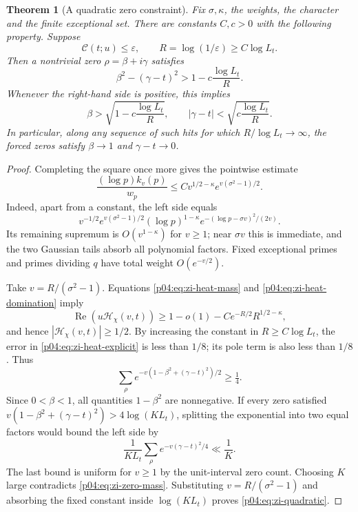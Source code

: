 \documentclass[11pt,letterpaper]{article}
\newtheorem{theorem}{Theorem}[section]
\theoremstyle{definition}
\theoremstyle{remark}
\renewcommand{\Re}{\operatorname{Re}}
\newcommand{\1}{\mathbf 1}
\begin{document}
\begin{theorem}[A quadratic zero constraint]
\label{p04:thm:zi-quadratic}
Fix $\sigma,\kappa$, the weights, the character and the finite
exceptional set.  There are constants $C,c>0$ with the following
property.  Suppose
\[
 \mathcal C(t;u)\le\varepsilon,\qquad
 R=\log(1/\varepsilon)\ge C\log L_t.
\]
Then a nontrivial zero $\rho=\beta+i\gamma$ satisfies
\begin{equation}
 \beta^2-(\gamma-t)^2>
          1-c\frac{\log L_t}{R}.
\label{p04:eq:zi-quadratic}
\end{equation}
Whenever the right-hand side is positive, this implies
\[
 \beta>\sqrt{1-c\frac{\log L_t}{R}},\qquad
 |\gamma-t|<\sqrt{c\frac{\log L_t}{R}}.
\]
In particular, along any sequence of such hits for which
$R/\log L_t\to\infty$, the forced zeros satisfy
$\beta\to1$ and $\gamma-t\to0$.
\end{theorem}
\begin{proof}
Completing the square once more gives the pointwise estimate
\begin{equation}
 \frac{(\log p)k_v(p)}{w_p}
 \le C v^{1/2-\kappa}e^{v(\sigma^2-1)/2}.
\label{p04:eq:zi-heat-domination}
\end{equation}
Indeed, apart from a constant, the left side equals
\[
 v^{-1/2}e^{v(\sigma^2-1)/2}
 (\log p)^{1-\kappa}
 e^{-(\log p-\sigma v)^2/(2v)}.
\]
Its remaining supremum is $O(v^{1-\kappa})$ for $v\ge1$;
near $\sigma v$ this is immediate, and the two Gaussian tails
absorb all polynomial factors.  Fixed exceptional primes and
primes dividing $q$ have total weight $O(e^{-v/2})$.

Take $v=R/(\sigma^2-1)$.  Equations
\eqref{p04:eq:zi-heat-mass} and \eqref{p04:eq:zi-heat-domination} imply
\[
 \Re(u\mathcal H_\chi(v,t))
 \ge1-o(1)-C e^{-R/2}R^{1/2-\kappa},
\]
and hence $|\mathcal H_\chi(v,t)|\ge1/2$.
By increasing the constant in $R\ge C\log L_t$, the error in
\eqref{p04:eq:zi-heat-explicit} is less than $1/8$; its pole term is
also less than $1/8$.  Thus
\begin{equation}
 \sum_\rho e^{-v(1-\beta^2+(\gamma-t)^2)/2}\ge\tfrac14.
\label{p04:eq:zi-zero-mass}
\end{equation}
Since $0<\beta<1$, all quantities $1-\beta^2$ are nonnegative.
If every zero satisfied
$v(1-\beta^2+(\gamma-t)^2)>4\log(KL_t)$, splitting the
exponential into two equal factors would bound the left side by
\[
 \frac1{KL_t}\sum_\rho e^{-v(\gamma-t)^2/4}
 \ll\frac1K.
\]
The last bound is uniform for $v\ge1$ by the unit-interval zero
count.  Choosing $K$ large contradicts \eqref{p04:eq:zi-zero-mass}.
Substituting $v=R/(\sigma^2-1)$ and absorbing the fixed constant
inside $\log(KL_t)$ proves \eqref{p04:eq:zi-quadratic}.
\end{proof}
\end{document}
